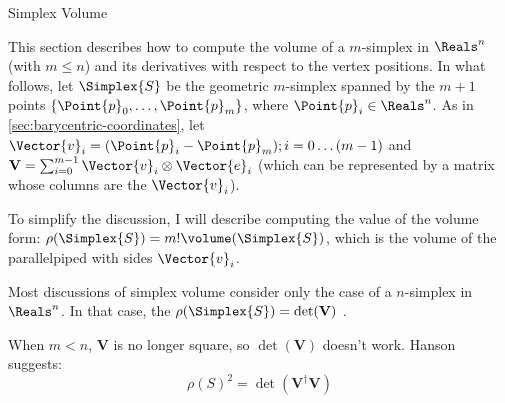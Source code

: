 \begin{plSection}{Simplex Volume}
\label{sec:simplex_volume}

\nocite{Heckbert:1974:GraphicsGems4}
\nocite{GoodmanORourke:2004:HDCG2}

This section describes how to compute
the volume of a $m$-simplex in $\Reals^n$ (with $m \le n$)
and its derivatives with respect to the vertex positions.
In what follows, let $\Simplex{S}$ be the geometric $m$-simplex
spanned by the $m+1$ points $\left\{\Point{p}_0 , \ldots , \Point{p}_m\right\}$,
where $\Point{p}_i \in \Reals^n$.
As in \cref{sec:barycentric-coordinates},
let $\Vector{v}_i = (\Point{p}_i - \Point{p}_m); i = 0 \ldots (m-1)$
and ${\mathbf V} = \sum_{i=0}^{m-1} \Vector{v}_i \otimes \Vector{e}_i$
(which can be represented by a matrix whose columns are the $\Vector{v}_i$).

To simplify the discussion, I will describe computing the
value of the volume form: 
$\rho(\Simplex{S}) = m! \volume(\Simplex{S})$,
which is the volume of the parallelpiped with sides $\Vector{v}_i$.

Most discussions of simplex volume consider
only the case of a $n$-simplex in $\Reals^n$.
In that case, the $\rho(\Simplex{S}) = \det({\mathbf V)}$
\cite{HenkRichterGebertZiegler:2004:ConvexPolytopes}.

When $m < n$, ${\mathbf V}$ is no longer square,
so $\det({\mathbf V})$ doesn't work.
Hanson \cite{Hanson:1994:NdGraphics} suggests:
\begin{equation}
\rho(S)^2 = \det({\mathbf V}^{\dagger} {\mathbf V})
\end{equation}

\end{plSection}%
